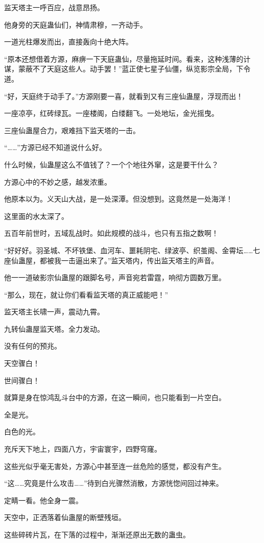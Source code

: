 \begin{this_body}
监天塔主一呼百应，战意昂扬。

他身旁的天庭蛊仙们，神情肃穆，一齐动手。

一道光柱爆发而出，直接轰向十绝大阵。

“原本还想借着方源，麻痹一下天庭蛊仙，尽量拖延时间。看来，这种浅薄的计谋，蒙蔽不了天庭这些人。动手罢！”蓝正使七星子仙僵，纵览影宗全局，下令道。

“好，天庭终于动手了。”方源刚要一喜，就看到又有三座仙蛊屋，浮现而出！

一座凉亭，红砖绿瓦。一座楼阁，白缕翻飞。一处地坛，金光摇曳。

三座仙蛊屋合力，艰难挡下监天塔的一击。

“……”方源已经不知道说什么好。

什么时候，仙蛊屋这么不值钱了？一个个地往外窜，这是要干什么？

方源心中的不妙之感，越发浓重。

他原本以为。义天山大战，是一处深潭。但没想到。这竟然是一处海洋！

这里面的水太深了。

五百年前世时，五域乱战时。如此规模的战斗，也只有五指之数啊！

“好好好。羽圣城、不坏铁堡、血河车、噩耗阴宅、绿波亭、织茧阁、金霄坛……七座仙蛊屋，都被我一击逼出来了。”监天塔内，传出监天塔主的声音。

他一一道破影宗仙蛊屋的跟脚名号，声音宛若雷霆，响彻方圆数万里。

“那么，现在，就让你们看看监天塔的真正威能吧！”

监天塔主长啸一声，震动九霄。

九转仙蛊屋监天塔。全力发动。

没有任何的预兆。

天空骤白！

世间骤白！

就算是身在惊鸿乱斗台中的方源，在这一瞬间，也只能看到一片空白。

全是光。

白色的光。

充斥天下地上，四面八方，宇宙寰宇，四野穹窿。

这些光似乎毫无害处，方源心中甚至连一丝危险的感觉，都没有产生。

“这……究竟是什么攻击……”待到白光骤然消散，方源恍惚间回过神来。

定睛一看。他全身一震。

天空中，正洒落着仙蛊屋的断壁残垣。

这些碎砖片瓦，在下落的过程中，渐渐还原出无数的蛊虫。


\end{this_body}
